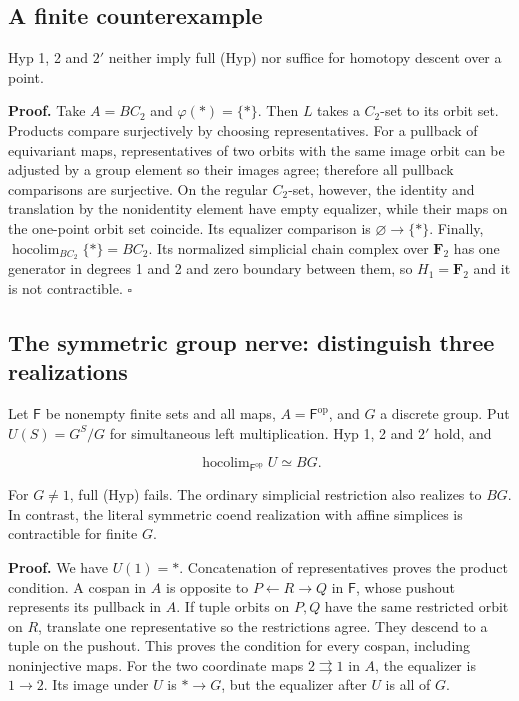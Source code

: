 \documentclass[11pt,a4paper]{article}
\theoremstyle{definition}
\begin{document}
\subsection{A finite
counterexample}\label{b5.2.-a-finite-counterexample}

Hyp 1, 2 and \(2'\) neither
imply full (Hyp) nor suffice for homotopy descent over a point.

\textbf{Proof.} Take \(A=BC_2\) and \(\varphi(*)=\{*\}\). Then \(L\)
takes a \(C_2\)-set to its orbit set. Products compare surjectively by
choosing representatives. For a pullback of equivariant maps,
representatives of two orbits with the same image orbit can be adjusted
by a group element so their images agree; therefore all pullback
comparisons are surjective. On the regular \(C_2\)-set, however, the
identity and translation by the nonidentity element have empty
equalizer, while their maps on the one-point orbit set coincide. Its
equalizer comparison is \(\varnothing\to\{*\}\). Finally,
\(\operatorname{hocolim}_{BC_2}\{*\}=BC_2\). Its normalized simplicial
chain complex over \(\mathbf F_2\) has one generator in degrees 1 and 2
and zero boundary between them, so \(H_1=\mathbf F_2\) and it is not
contractible. \(\square\)

\subsection{The symmetric group nerve: distinguish three
realizations}\label{b5.3.-the-symmetric-group-nerve-distinguish-three-realizations}

Let \(\mathsf F\) be nonempty finite sets and all maps,
\(A=\mathsf F^{\mathrm{op}}\), and \(G\) a discrete group. Put
\(U(S)=G^S/G\) for simultaneous left multiplication. Hyp 1, 2 and \(2'\)
hold, and

\[\operatorname{hocolim}_{\mathsf F^{\mathrm{op}}}U\simeq BG.\]

For \(G\ne1\), full (Hyp) fails. The ordinary simplicial restriction
also realizes to \(BG\). In contrast, the literal symmetric coend
realization with affine simplices is contractible for finite \(G\).

\textbf{Proof.} We have \(U(1)=*\). Concatenation of representatives
proves the product condition. A cospan in \(A\) is opposite to
\(P\leftarrow R\to Q\) in \(\mathsf F\), whose pushout represents its
pullback in \(A\). If tuple orbits on \(P,Q\) have the same restricted
orbit on \(R\), translate one representative so the restrictions agree.
They descend to a tuple on the pushout. This proves the condition for
every cospan, including noninjective maps. For the two coordinate maps
\(2\rightrightarrows1\) in \(A\), the equalizer is \(1\to2\). Its image
under \(U\) is \(*\to G\), but the equalizer after \(U\) is all of
\(G\).
\end{document}
